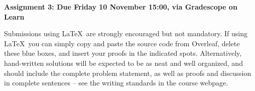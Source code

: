 \documentclass{article}
\begin{document}
\begin{centering}\textbf{Assignment 3: Due Friday 10 November 15:00, via Gradescope on Learn}\end{centering}

\begin{mdframed}[backgroundcolor=blue!20]
Submissions using \LaTeX\ are strongly encouraged but not mandatory. If using \LaTeX\, you can simply copy and paste the source code from Overleaf, delete these blue boxes, and insert your proofs in the indicated spots. Alternatively, hand-written solutions will be expected to be as neat and well organized, and should include the complete problem statement, as well as proofs and discussion in complete sentences -- see the writing standards in the course webpage.
\end{mdframed}
\end{document}
